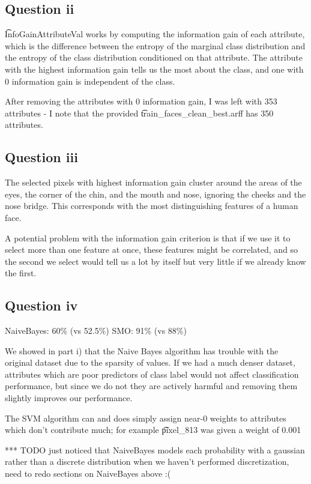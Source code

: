 \documentclass[a4paper]{article}
\begin{document}
\subsection*{Question ii}
\t{InfoGainAttributeVal} works by computing the information gain of each attribute, which is the difference between the entropy of the marginal class distribution and the entropy of the class distribution conditioned on that attribute. The attribute with the highest information gain tells us the most about the class, and one with 0 information gain is independent of the class.

After removing the attributes with 0 information gain, I was left with 353 attributes - I note that the provided \t{train_faces_clean_best.arff} has 350 attributes.

\subsection*{Question iii}
The selected pixels with highest information gain cluster around the areas of the eyes, the corner of the chin, and the mouth and nose, ignoring the cheeks and the nose bridge. This corresponds with the most distinguishing features of a human face.



A potential problem with the information gain criterion is that if we use it to select more than one feature at once, these features might be correlated, and so the second we select would tell us a lot by itself but very little if we already know the first.

\subsection*{Question iv}
NaiveBayes: 60\% (vs 52.5\%)
SMO: 91\% (vs 88\%)

We showed in part i) that the Naive Bayes algorithm has trouble with the original dataset due to the sparsity of values. If we had a much denser dataset, attributes which are poor predictors of class label would not affect classification performance, but since we do not they are actively harmful and removing them slightly improves our performance.

The SVM algorithm can and does simply assign near-0 weights to attributes which don't contribute much; for example \t{pixel_813} was given a weight of 0.001 


*** TODO just noticed that NaiveBayes models each probability with a gaussian rather than a discrete distribution when we haven't performed discretization, need to redo sections on NaiveBayes above :(
\end{document}
